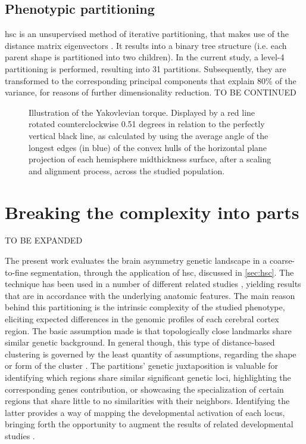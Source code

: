 \subsection{Phenotypic partitioning}\label{sec:hsc}
\Acf{hsc} is an unsupervised method of iterative partitioning, that makes use of the distance matrix eigenvectors \cite{Ng2002}. It results into a binary tree structure (i.e. each parent shape is partitioned into two children). In the current study, a level-4 partitioning is performed, resulting into 31 partitions. Subsequently, they are transformed to the corresponding principal components that explain 80\% of the variance, for reasons of further dimensionality reduction. TO BE CONTINUED


\begin{figure}
	\centering
	
	\caption[Illustration of the Yakovlevian torque]{Illustration of the Yakovlevian torque. Displayed by a red line rotated counterclockwise 0.51 degrees in relation to the perfectly vertical black line, as calculated by using the average angle of the longest edges (in blue) of the convex hulls of the horizontal plane projection of each hemisphere midthickness surface, after a scaling and alignment process, across the studied population.}
	\label{fig:yaktorque}
\end{figure}

\section{Breaking the complexity into parts}
TO BE EXPANDED

The present work evaluates the brain asymmetry genetic landscape in a coarse-to-fine segmentation, through the application of \ac{hsc}\cite{Ng2002}, discussed in \autoref{sec:hsc}. The technique has been used in a number of different related studies \cite{Claes2018}\cite{Naqvi2021}, yielding results that are in accordance with the underlying anatomic features. The main reason behind this partitioning is the intrinsic complexity of the studied phenotype, eliciting expected differences in the genomic profiles of each cerebral cortex region. The basic assumption made is that topologically close landmarks share similar genetic background. In general though, this type of distance-based clustering is governed by the least quantity of assumptions, regarding the shape or form of the cluster \cite{VonLuxburg2007}. The partitions' genetic juxtaposition is valuable for identifying which regions share similar significant genetic loci, highlighting the corresponding genes contribution, or showcasing the specialization of certain regions that share little to no similarities with their neighbors. Identifying the latter provides a way of mapping the developmental activation of each locus, bringing forth the opportunity to augment the results of related developmental studies \cite{Vijayakumar2016}.

